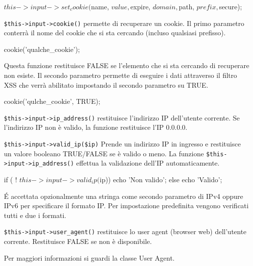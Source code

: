 \begin{code}
$this->input->set_cookie($name, $value, $expire, $domain, $path, $prefix, $secure);
\end{code}

\verb|$this->input->cookie()| permette di recuperare un cookie. Il primo parametro conterrà il nome del cookie che si sta cercando (incluso qualsiasi prefisso).

\begin{code}
cookie('qualche_cookie');
\end{code}

Questa funzione restituisce FALSE se l'elemento che si sta cercando di recuperare non esiste. Il secondo parametro permette di eseguire i dati attraverso il filtro \ac{XSS} che verrà abilitato impostando il secondo parametro su TRUE.

\begin{code}
cookie('qulche_cookie', TRUE);
\end{code}

\verb|$this->input->ip_address()| restituisce l'indirizzo IP dell'utente corrente. Se l'indirizzo IP non è valido, la funzione restituisce l'IP 0.0.0.0.


\verb|$this->input->valid_ip($ip)| Prende un indirizzo IP in ingresso e restituisce un valore booleano TRUE/FALSE se è valido o meno. La funzione \verb|$this->input->ip_address()| effettua la validazione dell'IP automaticamente.

\begin{code}
if ( ! $this->input->valid_ip($ip))
{
     echo 'Non valido';
}
else
{
     echo 'Valido';
}
\end{code}

\'E accettata opzionalmente una stringa come secondo parametro di IPv4 oppure IPv6 per specificare il formato IP. Per impostazione predefinita vengono verificati tutti e due i formati.

\verb|$this->input->user_agent()| restituisce lo user agent (browser web) dell'utente corrente. Restituisce FALSE se non è disponibile.


Per maggiori informazioni si guardi la classe User Agent.


